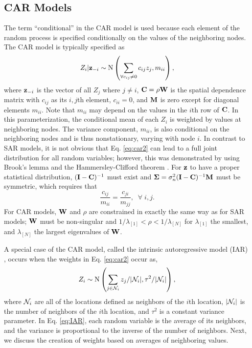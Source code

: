 \documentclass[11pt, titlepage]{article}\usepackage[]{graphicx}\usepackage[]{color}
\begin{document}
\begin{spacing}{1.9}
\begin{flushleft}


\subsection*{CAR Models}

The term ``conditional'' in the CAR model is used because each element of the random process is specified conditionally on the values of the neighboring nodes. The CAR model is typically specified as
\begin{equation}
				Z_i|\mathbf{z}_{-i} \sim \textrm{N}\left(\sum_{\forall c_{ij}\neq 0} c_{ij}z_j,m_{ii}\right),
  \label{eq:car2}
\end{equation}
where $\mathbf{z}_{-i}$ is the vector of all $Z_j$ where $j \ne i$, $\mathbf{C} =\rho\mathbf{W}$ is the spatial dependence matrix with $c_{ij}$ as its $i,j$th element, $c_{ii} = 0$, and $\mathbf{M}$ is zero except for diagonal elements $m_{ii}$. Note that $m_{ii}$ may depend on the values in the $i$th row of $\mathbf{C}$. In this parameterization, the conditional mean of each $Z_i$ is weighted by values at neighboring nodes. The variance component, $m_{ii}$, is also conditional on the neighboring nodes and is thus nonstationary, varying with node $i$.  In contrast to SAR models, it is not obvious that Eq. \ref{eq:car2} can lead to a full joint distribution for all random variables; however, this was demonstrated by \citet{Besa:spat:1974} using Brook's lemma \citep{Broo:dist:1964} and the Hammersley-Clifford theorem \citep{Hamm:Clif:Mark:1971,Clif:Mark:1990}. For $\mathbf{z}$ to have a proper statistical distribution, $(\mathbf{I}-\mathbf{C})^{-1}$ must exist and $\mbox{\boldmath $\Sigma$} = \sigma^2_n(\mathbf{I}-\mathbf{C})^{-1}\mathbf{M}$ must be symmetric, which requires that
\begin{equation} \label{eq:CarSymmetry}
				\frac{c_{ij}}{m_{ii}}=\frac{c_{ji}}{m_{jj}}, \; \; \forall \; i,j.
\end{equation}
For CAR models, $\mathbf{W}$ and $\rho$ are constrained in exactly the same way as for SAR models; $\mathbf{W}$ must be non-singular and $1/\lambda_{[1]} < \rho < 1/\lambda_{[N]}$ for $\lambda_{[1]}$ the smallest, and $\lambda_{[N]}$ the largest eigenvalues of $\mathbf{W}$.

A special case of the CAR model, called the intrinsic autoregressive model (IAR) \citep{Besa:Koop:cond:1995}, occurs when the weights in Eq. \ref{eq:car2} occur as,
\begin{equation} \label{eq:IAR}
 Z_i \sim \textrm{N}\left(\sum_{j \in \mathcal{N}_i} z_j/|\mathcal{N}_i|,\tau^2/|\mathcal{N}_i|\right),
\end{equation}
where $\mathcal{N}_i$ are all of the locations defined as neighbors of the $i$th location, $|\mathcal{N}_i|$ is the number of neighbors of the $i$th location, and $\tau^2$ is a constant variance parameter.  In Eq. \ref{eq:IAR}, each random variable is the average of its neighbors, and the variance is proportional to the inverse of the number of neighbors.  Next, we discuss the creation of weights based on averages of neighboring values.


\end{flushleft}
\end{spacing}
\end{document}
